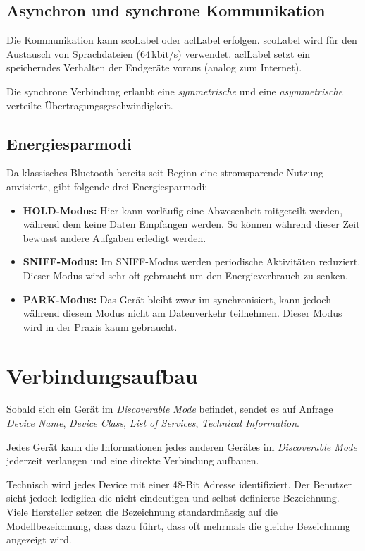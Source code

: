 \subsection{Asynchron und synchrone Kommunikation}
Die Kommunikation kann \gls{scoLabel} oder \gls{aclLabel} erfolgen.
\gls{scoLabel} wird für den Austausch von Sprachdateien (64\,kbit/s) verwendet.
\gls{aclLabel} setzt ein speicherndes Verhalten der Endgeräte voraus (analog zum Internet).

Die synchrone Verbindung erlaubt eine \textit{symmetrische} und eine \textit{asymmetrische} verteilte Übertragungsgeschwindigkeit.


\subsection{Energiesparmodi}
\label{subsec:energymode}
Da klassisches Bluetooth bereits seit Beginn eine stromsparende Nutzung anvisierte, gibt folgende drei Energiesparmodi:
\begin{itemize}
	\item \textbf{HOLD-Modus:} Hier kann vorläufig eine Abwesenheit mitgeteilt werden, während dem keine Daten Empfangen werden. So können während dieser Zeit bewusst andere Aufgaben erledigt werden.
	\item \textbf{SNIFF-Modus:} Im SNIFF-Modus werden periodische Aktivitäten reduziert. Dieser Modus wird sehr oft gebraucht um den Energieverbrauch zu senken.
	\item \textbf{PARK-Modus:} Das Gerät bleibt zwar im synchronisiert, kann jedoch während diesem Modus nicht am Datenverkehr teilnehmen. Dieser Modus wird in der Praxis kaum gebraucht.
\end{itemize}


\section{Verbindungsaufbau}
Sobald sich ein Gerät im \textit{Discoverable Mode} befindet, sendet es auf Anfrage \textit{Device Name}, \textit{Device Class}, \textit{List of Services}, \textit{Technical Information}.

Jedes Gerät kann die Informationen jedes anderen Gerätes im \textit{Discoverable Mode} jederzeit verlangen und eine direkte Verbindung aufbauen.

Technisch wird jedes Device mit einer 48-Bit Adresse identifiziert. Der Benutzer sieht jedoch lediglich die nicht eindeutigen und selbst definierte Bezeichnung. Viele Hersteller setzen die Bezeichnung standardmässig auf die Modellbezeichnung, dass dazu führt, dass oft mehrmals die gleiche Bezeichnung angezeigt wird.

